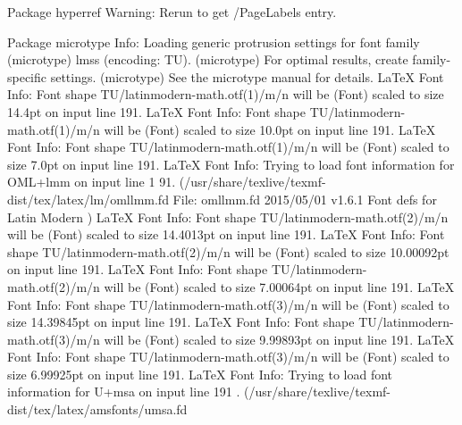 \documentclass[
  letterpaper,
  DIV=11,
  numbers=noendperiod]{scrartcl}
\newenvironment{Shaded}{\begin{snugshade}}{\end{snugshade}}
\newcommand{\NormalTok}[1]{\textcolor[rgb]{0.00,0.23,0.31}{#1}}
\begin{document}
\begin{Shaded}
\begin{Highlighting}[]
\NormalTok{Package hyperref Warning: Rerun to get /PageLabels entry.}

\NormalTok{Package microtype Info: Loading generic protrusion settings for font family}
\NormalTok{(microtype)             \textasciigrave{}lmss\textquotesingle{} (encoding: TU).}
\NormalTok{(microtype)             For optimal results, create family{-}specific settings.}
\NormalTok{(microtype)             See the microtype manual for details.}
\NormalTok{LaTeX Font Info:    Font shape \textasciigrave{}TU/latinmodern{-}math.otf(1)/m/n\textquotesingle{} will be}
\NormalTok{(Font)              scaled to size 14.4pt on input line 191.}
\NormalTok{LaTeX Font Info:    Font shape \textasciigrave{}TU/latinmodern{-}math.otf(1)/m/n\textquotesingle{} will be}
\NormalTok{(Font)              scaled to size 10.0pt on input line 191.}
\NormalTok{LaTeX Font Info:    Font shape \textasciigrave{}TU/latinmodern{-}math.otf(1)/m/n\textquotesingle{} will be}
\NormalTok{(Font)              scaled to size 7.0pt on input line 191.}
\NormalTok{LaTeX Font Info:    Trying to load font information for OML+lmm on input line 1}
\NormalTok{91.}
\NormalTok{(/usr/share/texlive/texmf{-}dist/tex/latex/lm/omllmm.fd}
\NormalTok{File: omllmm.fd 2015/05/01 v1.6.1 Font defs for Latin Modern}
\NormalTok{)}
\NormalTok{LaTeX Font Info:    Font shape \textasciigrave{}TU/latinmodern{-}math.otf(2)/m/n\textquotesingle{} will be}
\NormalTok{(Font)              scaled to size 14.4013pt on input line 191.}
\NormalTok{LaTeX Font Info:    Font shape \textasciigrave{}TU/latinmodern{-}math.otf(2)/m/n\textquotesingle{} will be}
\NormalTok{(Font)              scaled to size 10.00092pt on input line 191.}
\NormalTok{LaTeX Font Info:    Font shape \textasciigrave{}TU/latinmodern{-}math.otf(2)/m/n\textquotesingle{} will be}
\NormalTok{(Font)              scaled to size 7.00064pt on input line 191.}
\NormalTok{LaTeX Font Info:    Font shape \textasciigrave{}TU/latinmodern{-}math.otf(3)/m/n\textquotesingle{} will be}
\NormalTok{(Font)              scaled to size 14.39845pt on input line 191.}
\NormalTok{LaTeX Font Info:    Font shape \textasciigrave{}TU/latinmodern{-}math.otf(3)/m/n\textquotesingle{} will be}
\NormalTok{(Font)              scaled to size 9.99893pt on input line 191.}
\NormalTok{LaTeX Font Info:    Font shape \textasciigrave{}TU/latinmodern{-}math.otf(3)/m/n\textquotesingle{} will be}
\NormalTok{(Font)              scaled to size 6.99925pt on input line 191.}
\NormalTok{LaTeX Font Info:    Trying to load font information for U+msa on input line 191}
\NormalTok{.}
\NormalTok{(/usr/share/texlive/texmf{-}dist/tex/latex/amsfonts/umsa.fd}

\end{Highlighting}
\end{Shaded}
\end{document}
